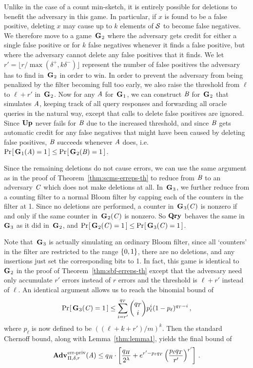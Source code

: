Unlike in the case of a count min-sketch, it is entirely possible for deletions
to benefit the adversary in this game. In particular, if $x$ is found to be a
false positive, deleting $x$ may cause up to $k$ elements of $\mathcal{S}$ to become
false negatives. We therefore move to a game~$\textup{\textbf{G}}\hspace{0.5pt}_2$ where the adversary gets
credit for either a single false positive or for $k$ false negatives whenever it
finds a false positive, but where the adversary cannot delete any false
positives that it finds. We let $r' = \lfloor r/\max(\delta^+,k\delta^-)\rfloor$
represent the number of false positives the adversary has to find in~$\textup{\textbf{G}}\hspace{0.5pt}_2$
in order to win. In order to prevent the adversary from being penalized by the
filter becoming full too early, we also raise the threshold from $\ell$ to
$\ell+r'$ in~$\textup{\textbf{G}}\hspace{0.5pt}_2$. Now for any $\mathit{A}$ for~$\textup{\textbf{G}}\hspace{0.5pt}_1$, we can construct
$\mathit{B}$ for~$\textup{\textbf{G}}\hspace{0.5pt}_2$ that simulates $\mathit{A}$, keeping track of all query
responses and forwarding all oracle queries in the natural way, except that
calls to delete false positives are ignored. Since $\textup{\textbf{Up}}\hspace{0.5pt}$ never fails for
$\mathit{B}$ due to the increased threshold, and since $\mathit{B}$ gets automatic credit
for any false negatives that might have been caused by deleting false positives,
$\mathit{B}$ succeeds whenever $\mathit{A}$ does, i.e.
$\Pr\hspace{-1pt}\left[\,\textup{\textbf{G}}\hspace{0.5pt}_1(\mathit{A})=1\,\right] \le \Pr\hspace{-1pt}\left[\,\textup{\textbf{G}}\hspace{0.5pt}_2(\mathit{B}) = 1\,\right]$.

Since the remaining deletions do not cause errors, we can use the same argument
as in the proof of Theorem~\ref{thm:scms-erreps-th} to reduce from $\mathit{B}$ to an
adversary $\mathit{C}$ which does not make deletions at all. In~$\textup{\textbf{G}}\hspace{0.5pt}_3$, we further
reduce from a counting filter to a normal Bloom filter by capping each of the
counters in the filter at 1. Since no deletions are performed, a counter
in~$\textup{\textbf{G}}\hspace{0.5pt}_3(\mathit{C})$ is nonzero if and only if the same counter
in~$\textup{\textbf{G}}\hspace{0.5pt}_2(\mathit{C})$ is nonzero. So $\textup{\textbf{Qry}}\hspace{0.5pt}$ behaves the same in~$\textup{\textbf{G}}\hspace{0.5pt}_3$ as it
did in~$\textup{\textbf{G}}\hspace{0.5pt}_2$, and $\Pr\hspace{-1pt}\left[\,\textup{\textbf{G}}\hspace{0.5pt}_2(\mathit{C})=1\,\right] \le \Pr\hspace{-1pt}\left[\,\textup{\textbf{G}}\hspace{0.5pt}_3(\mathit{C}) = 1\,\right]$.

Note that~$\textup{\textbf{G}}\hspace{0.5pt}_3$ is actually simulating an ordinary Bloom filter, since all
`counters' in the filter are restricted to the range $\{0,1\}$, there are no
deletions, and any insertions just set the corresponding bits to 1. In fact,
this game is identical to~$\textup{\textbf{G}}\hspace{0.5pt}_2$ in the proof of
Theorem~\ref{thm:sbf-erreps-th} except that the adversary need only accumulate
$r'$ errors instead of $r$ errors and the threshold is $\ell+r'$ instead of
$\ell$. An identical argument allows us to reach the binomial bound of
\begin{equation}
   \Pr\hspace{-1pt}\left[\,\textup{\textbf{G}}\hspace{0.5pt}_3(\mathit{C})=1\,\right] \le
     \sum_{i=r'}^{q_T} \binom{q_T}{i}p_\ell^i(1-p_\ell)^{q_T-i} \,,
\end{equation}
where $p_\ell$ is now defined to be $((\ell+k+r')/m)^k$. Then the standard
Chernoff bound, along with Lemma~\ref{thm:lemma1}, yields the final bound of
\begin{equation}
   \Adv{\erreps}_{\Pi,\delta,r}(\advA) \leq
     q_R \cdot \left[\frac{q_H}{2^\lambda} + e^{r'-p_\ell q_T}\left(\frac{p_\ell
     q_T}{r'}\right)^{r'}\right] \,.
\end{equation}
